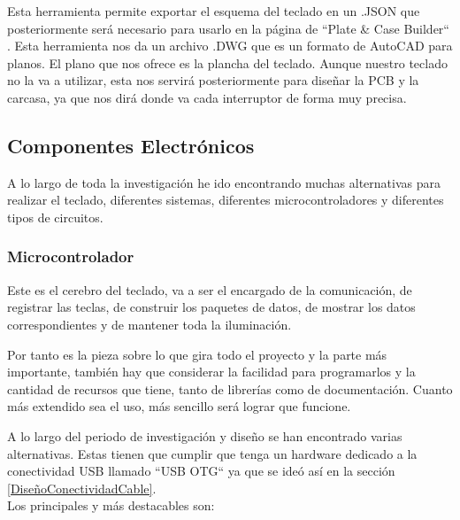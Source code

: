 Esta herramienta permite exportar el esquema del teclado en un .JSON que posteriormente será necesario para usarlo en la página de ``Plate \& Case Builder`` \cite{builder-swillkb}. Esta herramienta nos da un archivo .DWG que es un formato de AutoCAD para planos. El plano que nos ofrece es la plancha del teclado. Aunque nuestro teclado no la va a utilizar, esta nos servirá posteriormente para diseñar la \gls{PCB} y la carcasa, ya que nos dirá donde va cada interruptor de forma muy precisa.

\newpage
\subsection{Componentes Electrónicos}
A lo largo de toda la investigación he ido encontrando muchas alternativas para realizar el teclado, diferentes sistemas, diferentes microcontroladores y diferentes tipos de circuitos.

\subsubsection{Microcontrolador}
Este es el cerebro del teclado, va a ser el encargado de la comunicación, de registrar las teclas, de construir los paquetes de datos, de mostrar los datos correspondientes y de mantener toda la iluminación.

Por tanto es la pieza sobre lo que gira todo el proyecto y la parte más importante, también hay que considerar la facilidad para programarlos y la cantidad de recursos que tiene, tanto de librerías como de documentación.
Cuanto más extendido sea el uso, más sencillo será lograr que funcione.

A lo largo del periodo de investigación y diseño se han encontrado varias alternativas. Estas tienen que cumplir que tenga un hardware dedicado a la conectividad \gls{USB} llamado ``\gls{USB} OTG`` ya que se ideó así en la sección \ref{DiseñoConectividadCable}. \\
Los principales y más destacables son:

